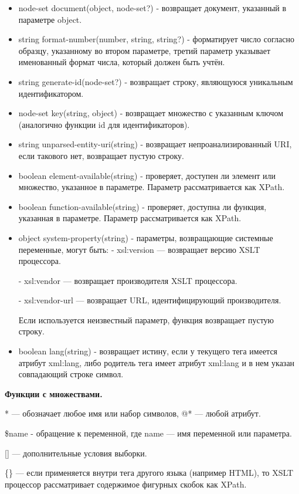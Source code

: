\documentclass[12pt,a4paper,oneside]{article} %
\begin{document}
\begin{itemize}
\item node-set document(object, node-set?) - возвращает документ, указанный в параметре object.
\item string format-number(number, string, string?) - форматирует число согласно образцу, указанному во втором параметре, третий параметр указывает именованный формат числа, который должен быть учтён.
\item string generate-id(node-set?) - возвращает строку, являющуюся уникальным идентификатором.
\item node-set key(string, object) - возвращает множество с указанным ключом (аналогично функции id для идентификаторов).
\item string unparsed-entity-uri(string) - возвращает непроанализированный URI, если такового нет, возвращает пустую строку.
\item boolean element-available(string) - проверяет, доступен ли элемент или множество, указанное в параметре. Параметр рассматривается как XPath.
\item boolean function-available(string) - проверяет, доступна ли функция, указанная в параметре. Параметр рассматривается как XPath.
\item object system-property(string) - параметры, возвращающие системные переменные, могут быть:
- xsl:version — возвращает версию XSLT процессора.

- xsl:vendor — возвращает производителя XSLT процессора.

- xsl:vendor-url — возвращает URL, идентифицирующий производителя.

Если используется неизвестный параметр, функция возвращает пустую строку.

\item boolean lang(string) - возвращает истину, если у текущего тега имеется атрибут xml:lang, либо родитель тега имеет атрибут xml:lang и в нем указан совпадающий строке символ.
\end{itemize}

\textbf{Функции с множествами.}

* — обозначает любое имя или набор символов, @* — любой атрибут.

\$name - обращение к переменной, где name — имя переменной или параметра.

[] — дополнительные условия выборки.

\{\} — если применяется внутри тега другого языка (например HTML), то XSLT процессор рассматривает содержимое фигурных скобок как XPath.
\end{document}
